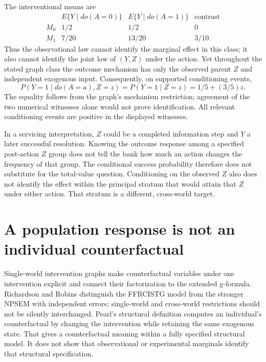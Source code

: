 The interventional means are
\[
\begin{array}{c|cc|c}
 &E\{Y\mid do(A=0)\}&E\{Y\mid do(A=1)\}&\text{contrast}\\ \hline
 M_0&1/2&1/2&0\\
 M_1&7/20&13/20&3/10 .
\end{array}
\]
Thus the observational law cannot identify the marginal effect in
this class; it also cannot identify the joint law of $(Y,Z)$ under
the action. Yet throughout the stated graph class the outcome mechanism
has only the observed parent $Z$ and independent exogenous input.
Consequently, on supported conditioning events,
\[
 P(Y=1\mid do(A=a),Z=z)=P(Y=1\mid Z=z)
                     =1/5+(3/5)z.
\]
The equality follows from the graph's mechanism restriction; agreement
of the two numerical witnesses alone would not prove identification.
All relevant conditioning events are positive in the displayed
witnesses.\citep{id2006,exec17_s3_exact}

In a servicing interpretation, $Z$ could be a completed information
step and $Y$ a later successful resolution. Knowing the outcome response
among a specified post-action $Z$ group does not tell the bank how much
an action changes the frequency of that group. The conditional success
probability therefore does not substitute for the total-value question.
Conditioning on the observed $Z$ also does not identify the effect
within the principal stratum that would attain that $Z$ under either
action. That stratum is a different, cross-world target.

\section{A population response is not an individual counterfactual}
\label{exec17:s3-coupling}

Single-world intervention graphs make counterfactual variables under
one intervention explicit and connect their factorization to the
extended g-formula. Richardson and Robins distinguish the FFRCISTG
model from the stronger NPSEM with independent errors; single-world
and cross-world restrictions should not be silently interchanged.
Pearl's structural definition computes an individual's counterfactual
by changing the intervention while retaining the same exogenous state.
That gives a counterfactual meaning within a fully specified structural
model. It does not show that observational or experimental marginals
identify that structural specification.\citep{swig2013,pearl2009}

